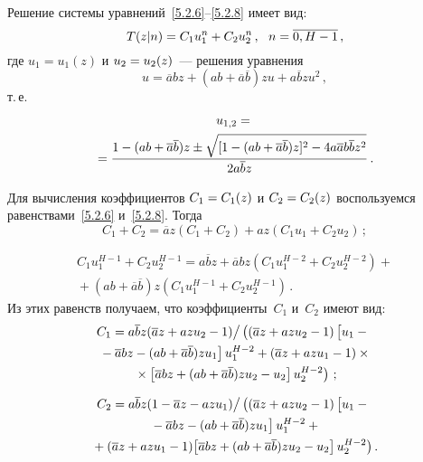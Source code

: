 \begin{multicols}{2}
Решение системы уравнений~\eqref{5.2.6}--\eqref{5.2.8} имеет вид:
\begin{equation*}
T(z|n) = C_1 u_1^n + C_2 u_2^n \,,\ \ n=\overline{0,H-1}\,,
\end{equation*}
где $u_1=u_1(z)$ и $u_2\hm=u_2(z)$~--- решения уравнения
\begin{equation*}
u = \overline{a} b z + (a b + \overline{a} \overline{b}) z u +
a \overline{b} z u^2 \,,
\end{equation*}
т.\,е.
\begin{multline*}
u_{1,2} ={}\\
\!{}= \displaystyle\frac{\displaystyle  1 - (a b + \overline{a} \overline{b}) z
\pm \sqrt{[1 - (a b + \overline{a} \overline{b}) z]^2 -
4 a \overline{a} b \overline{b} z^2}\mathstrut}{\displaystyle 2 a \overline{b} z \mathstrut}\,.
\end{multline*}

Для вычисления коэффициентов $C_1\hm=C_1(z)$ и
$C_2\hm=C_2(z)$ воспользуемся равенствами~\eqref{5.2.6} и~\eqref{5.2.8}.
Тогда
\begin{equation*}
C_1 + C_2 = \overline{a} z (C_1 + C_2) + a z (C_1 u_1 + C_2 u_2)\,;
\end{equation*}

\vspace*{-12pt}

\noindent
\begin{multline*}
\!\!\!C_1 u_1^{H-1} + C_2 u_2^{H-1} = a \overline{b} z +
\overline{a} b z (C_1 u_1^{H-2} + C_2 u_2^{H-2}) +{}\\
{}+
(a b + \overline{a} \overline{b}) z (C_1 u_1^{H-1} + C_2 u_2^{H-1})\,.
\end{multline*}
Из этих равенств получаем, что коэффициенты~$C_1$ и~$C_2$ имеют вид:
\begin{multline*}
C_1 =
a \overline{b} z (\overline{a} z + a z u_2 - 1)\big /
\left((\overline{a} z + a z u_2 - 1) \left[ \vphantom{\overline{b}}
u_1 -{}\right.\right.\\
\left.\left.{}- \overline{a} b z -
(a b + \overline{a} \overline{b}) z u_1 \right] u_1^{H-2}
+ (\overline{a} z + a z u_1 - 1)\times{}\right.\\
\left.{}\times \left[
\overline{a} b z + (a b + \overline{a} \overline{b}) z u_2
- u_2 \right] u_2^{H-2} \right)\,;
\end{multline*}


\noindent
\begin{multline*}
C_2 =
{ a \overline{b} z (1 - \overline{a} z - a z u_1)}\big /
\left((\overline{a} z + a z u_2 - 1) \left[  \vphantom{\overline{b}}
u_1 -{}\right.\right.\\
\left.{}- \overline{a} b z -
(a b + \overline{a} \overline{b}) z u_1 \right] u_1^{H-2} +{}\\
\!\!\!\left.{}+(\overline{a} z + a z u_1 - 1)\!
\left[ \overline{a} b z
+ (a b + \overline{a} \overline{b}) z u_2 - u_2 \right] u_2^{H-2}\right).\hspace*{-3.44753pt}
\end{multline*}


\end{multicols}
